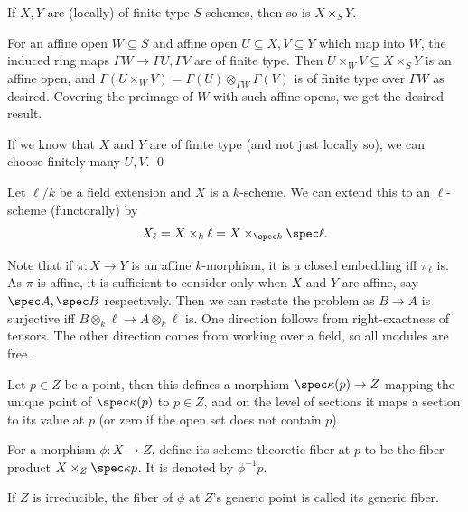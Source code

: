 \eproof

\bprop

    If $X,Y$ are (locally) of finite type $S$-schemes, then so is $X\times_SY$.

\eprop

\bproof

    For an affine open $W\subseteq S$ and affine open $U\subseteq X,V\subseteq Y$ which map into $W$,
    the induced ring maps $\Gamma W\to\Gamma U,\Gamma V$ are of finite type.
    Then $U\times_WV\subseteq X\times_SY$ is an affine open, and
    $\Gamma(U\times_WV)=\Gamma(U)\otimes_{\Gamma W}\Gamma(V)$ is of finite type over $\Gamma W$ as desired.
    Covering the preimage of $W$ with such affine opens, we get the desired result.

    If we know that $X$ and $Y$ are of finite type (and not just locally so), we can choose finitely
    many $U,V$.
    \qed

\eproof

\bdefn

    Let $\ell/k$ be a field extension and $X$ is a $k$-scheme.
    We can extend this to an $\ell$-scheme (functorally) by
    $$ X_\ell = X \times_k \ell = X \times_{\spec k}\spec\ell . $$

\edefn

Note that if $\pi\colon X\to Y$ is an affine $k$-morphism, it is a closed embedding iff $\pi_\ell$ is.
As $\pi$ is affine, it is sufficient to consider only when $X$ and $Y$ are affine, say $\spec A,\spec B$
respectively.
Then we can restate the problem as $B\to A$ is surjective iff $B\otimes_k\ell\to A\otimes_k\ell$ is.
One direction follows from right-exactness of tensors.
The other direction comes from working over a field, so all modules are free.

\bdefn

    Let $p\in Z$ be a point, then this defines a morphism $\spec\kappa(p)\to Z$ mapping the unique point
    of $\spec\kappa(p)$ to $p\in Z$, and on the level of sections it maps a section to its value at $p$
    (or zero if the open set does not contain $p$).

    For a morphism $\phi\colon X\to Z$, define its {\emphcolor scheme-theoretic fiber} at $p$ to be the
    fiber product $X\times_Z\spec\kappa p$.
    It is denoted by $\phi^{-1}p$.

    If $Z$ is irreducible, the fiber of $\phi$ at $Z$'s generic point is called its {\emphcolor generic
    fiber}.

\edefn

